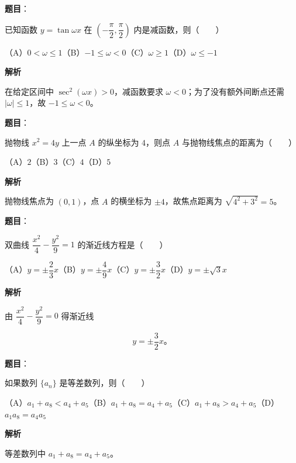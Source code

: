 \begin{answer}

\textbf{题目}：

已知函数 $y=\tan\omega x$ 在 $\left(-\dfrac{\pi}{2},\dfrac{\pi}{2}\right)$ 内是减函数，则\mbox{（　　）}

（A）$0<\omega\leqslant1$\quad（B）$-1\leqslant\omega<0$\quad（C）$\omega\geqslant1$\quad（D）$\omega\leqslant-1$

\textbf{解析}

在给定区间中 $\sec^2(\omega x)>0$，减函数要求 $\omega<0$；为了没有额外间断点还需 $|\omega|\leqslant1$，故 $-1\leqslant\omega<0$。


\end{answer}
\begin{answer}

\textbf{题目}：

抛物线 $x^2=4y$ 上一点 $A$ 的纵坐标为 $4$，则点 $A$ 与抛物线焦点的距离为\mbox{（　　）}

（A）$2$\quad（B）$3$\quad（C）$4$\quad（D）$5$

\textbf{解析}

抛物线焦点为 $(0,1)$，点 $A$ 的横坐标为 $\pm4$，故焦点距离为 $\sqrt{4^2+3^2}=5$。


\end{answer}
\begin{answer}

\textbf{题目}：

双曲线 $\dfrac{x^2}{4}-\dfrac{y^2}{9}=1$ 的渐近线方程是\mbox{（　　）}

（A）$y=\pm\dfrac23x$\quad（B）$y=\pm\dfrac49x$\quad（C）$y=\pm\dfrac32x$\quad（D）$y=\pm\sqrt3x$

\textbf{解析}

由 $\dfrac{x^2}{4}-\dfrac{y^2}{9}=0$ 得渐近线

\nopagebreak[4]
\[
y=\pm\frac32x\text{。}
\]


\end{answer}
\begin{answer}

\textbf{题目}：

如果数列 $\{a_n\}$ 是等差数列，则\mbox{（　　）}

（A）$a_1+a_8<a_4+a_5$\quad（B）$a_1+a_8=a_4+a_5$\quad（C）$a_1+a_8>a_4+a_5$\quad（D）$a_1a_8=a_4a_5$

\textbf{解析}

等差数列中 $a_1+a_8=a_4+a_5$。


\end{answer}

